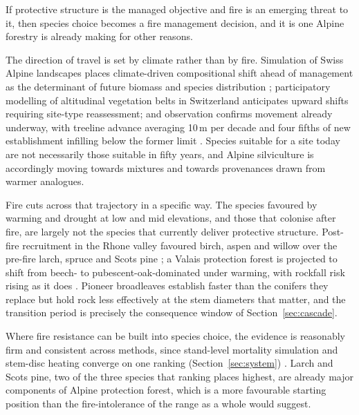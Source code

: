 \documentclass[11pt,a4paper]{article}
\begin{document}
If protective structure is the managed objective and fire is an emerging threat to it, then species choice becomes a fire management decision, and it is one Alpine forestry is already making for other reasons.

The direction of travel is set by climate rather than by fire. Simulation of Swiss Alpine landscapes places climate-driven compositional shift ahead of management as the determinant of future biomass and species distribution \citep{schumacher_relative_2006}; participatory modelling of altitudinal vegetation belts in Switzerland anticipates upward shifts requiring site-type reassessment; and observation confirms movement already underway, with treeline advance averaging 10\,m per decade and four fifths of new establishment infilling below the former limit \citep{frei_evidence_2023}. Species suitable for a site today are not necessarily those suitable in fifty years, and Alpine silviculture is accordingly moving towards mixtures and towards provenances drawn from warmer analogues.

Fire cuts across that trajectory in a specific way. The species favoured by warming and drought at low and mid elevations, and those that colonise after fire, are largely not the species that currently deliver protective structure. Post-fire recruitment in the Rhone valley favoured birch, aspen and willow over the pre-fire larch, spruce and Scots pine \citep{moser_potential_2010}; a Valais protection forest is projected to shift from beech- to pubescent-oak-dominated under warming, with rockfall risk rising as it does \citep{moos_climate_2021}. Pioneer broadleaves establish faster than the conifers they replace but hold rock less effectively at the stem diameters that matter, and the transition period is precisely the consequence window of Section~\ref{sec:cascade}.

Where fire resistance can be built into species choice, the evidence is reasonably firm and consistent across methods, since stand-level mortality simulation and stem-disc heating converge on one ranking (Section~\ref{sec:system}) \citep{dupire_vulnerability_2019, mutterer_bark_2026}. Larch and Scots pine, two of the three species that ranking places highest, are already major components of Alpine protection forest, which is a more favourable starting position than the fire-intolerance of the range as a whole would suggest.
\end{document}
